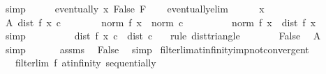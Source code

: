 \begin{isabellebody}
\ simp\isanewline
\ \ \isamarkupfalse%
\ \isamarkupfalse%
\ {\isachardoublequoteopen}eventually\ {\isacharparenleft}{\kern0pt}{\isasymlambda}x{\isachardot}{\kern0pt}\ False{\isacharparenright}{\kern0pt}\ F{\isachardoublequoteclose}\isanewline
\ \ \isamarkupfalse%
\ eventually{\isacharunderscore}{\kern0pt}elim\isanewline
\ \ \ \ \isamarkupfalse%
\ x\isanewline
\ \ \ \ \isamarkupfalse%
\ A{\isacharcolon}{\kern0pt}\ {\isachardoublequoteopen}dist\ {\isacharparenleft}{\kern0pt}f\ x{\isacharparenright}{\kern0pt}\ c\ {\isacharless}{\kern0pt}\ {}{\isacharslash}{\kern0pt}{}{\isachardoublequoteclose}\isanewline
\ \ \ \ \isamarkupfalse%
\ {\isachardoublequoteopen}norm\ {\isacharparenleft}{\kern0pt}f\ x{\isacharparenright}{\kern0pt}\ {\isasymge}\ norm\ c\ {\isacharplus}{\kern0pt}\ {}{\isachardoublequoteclose}\isanewline
\ \ \ \ \isamarkupfalse%
\ \isamarkupfalse%
\ {\isachardoublequoteopen}norm\ {\isacharparenleft}{\kern0pt}f\ x{\isacharparenright}{\kern0pt}\ {\isacharequal}{\kern0pt}\ dist\ {\isacharparenleft}{\kern0pt}f\ x{\isacharparenright}{\kern0pt}\ {}{\isachardoublequoteclose}\ \isamarkupfalse%
\ simp\isanewline
\ \ \ \ \isamarkupfalse%
\ \isamarkupfalse%
\ {\isachardoublequoteopen}{\isasymdots}\ {\isasymle}\ dist\ {\isacharparenleft}{\kern0pt}f\ x{\isacharparenright}{\kern0pt}\ c\ {\isacharplus}{\kern0pt}\ dist\ c\ {}{\isachardoublequoteclose}\ \isamarkupfalse%
\ {\isacharparenleft}{\kern0pt}rule\ dist{\isacharunderscore}{\kern0pt}triangle{\isacharparenright}{\kern0pt}\isanewline
\ \ \ \ \isamarkupfalse%
\ \isamarkupfalse%
\ False\ \isamarkupfalse%
\ A\ \isamarkupfalse%
\ simp\isanewline
\ \ \isamarkupfalse%
\isanewline
\ \ \isamarkupfalse%
\ assms\ \isamarkupfalse%
\ False\ \isamarkupfalse%
\ simp\isanewline
{}\isamarkupfalse%
%
\endisatagproof
{\isafoldproof}%
%
\isadelimproof
\isanewline
%
\endisadelimproof
\isanewline
{}\isamarkupfalse%
\ filterlim{\isacharunderscore}{\kern0pt}at{\isacharunderscore}{\kern0pt}infinity{\isacharunderscore}{\kern0pt}imp{\isacharunderscore}{\kern0pt}not{\isacharunderscore}{\kern0pt}convergent{\isacharcolon}{\kern0pt}\isanewline
\ \ \ {\isachardoublequoteopen}filterlim\ f\ at{\isacharunderscore}{\kern0pt}infinity\ sequentially{\isachardoublequoteclose}\isanewline

\end{isabellebody}
